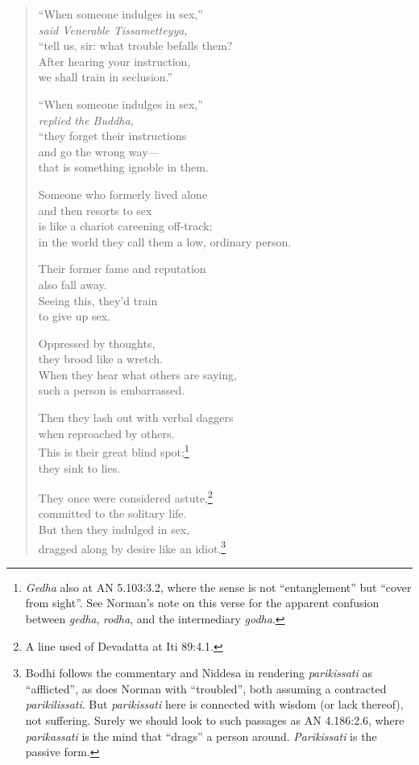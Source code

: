 \documentclass[12pt,openany]{book}%
\newcommand*{\scspeaker}[1]{\hspace{2em}\textit{#1}}
\begin{document}
\begin{verse}%
“When someone indulges in sex,” \\
\scspeaker{said Venerable Tissametteyya, }\\
“tell us, sir: what trouble befalls them? \\
After hearing your instruction, \\
we shall train in seclusion.” 

“When someone indulges in sex,” \\
\scspeaker{replied the Buddha, }\\
“they forget their instructions \\
and go the wrong way—\\
that is something ignoble in them. 

Someone who formerly lived alone \\
and then resorts to sex \\
is like a chariot careening off-track; \\
in the world they call them a low, ordinary person. 

Their former fame and reputation \\
also fall away. \\
Seeing this, they’d train \\
to give up sex. 

Oppressed by thoughts, \\
they brood like a wretch. \\
When they hear what others are saying, \\
such a person is embarrassed. 

Then they lash out with verbal daggers \\
when reproached by others. \\
This is their great blind spot;\footnote{\textit{Gedha} also at AN 5.103:3.2, where the sense is not “entanglement” but “cover from sight”. See Norman’s note on this verse for the apparent confusion between \textit{gedha}, \textit{rodha}, and the intermediary \textit{godha}. } \\
they sink to lies. 

They once were considered astute,\footnote{A line used of Devadatta at Iti 89:4.1. } \\
committed to the solitary life. \\
But then they indulged in sex, \\
dragged along by desire like an idiot.\footnote{Bodhi follows the commentary and Niddesa in rendering \textit{parikissati} as “afflicted”, as does Norman with “troubled”, both assuming a contracted \textit{parikilissati}. But \textit{parikissati} here is connected with wisdom (or lack thereof), not suffering. Surely we should look to such passages as AN 4.186:2.6, where \textit{parikassati} is the mind that “drags” a person around. \textit{Parikissati} is the passive form. } 


\end{verse}
\end{document}
